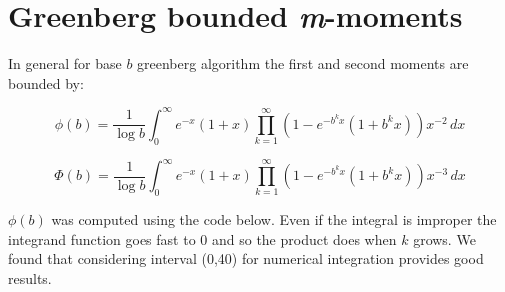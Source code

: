 \begin{appendices}
\begin{table}[H]
\caption[\emph{Clipped Modified Binary Tree}: Performance report.]{\emph{Clipped Modified Binary Tree}: performance report. Experimental results obtained by running CMBT algorithm on  random generated instances.}
\begin{center}
\end{center}
\end{table}


\section{Greenberg bounded \emph{m}-moments}
\label{sec:greenberg-moments}
In general for base $b$ greenberg algorithm the first and second moments are bounded by:

\begin{equation}
\phi(b)= \frac{1}{\log b} \int_{0}^{\infty} \! e^{-x}(1+x) \prod_{k=1}^{\infty}(1-e^{-b^{k}x}(1+b^{k}x))x^{-2} \, dx
\label{eq:greenberg-b-phi}
\end{equation}

\begin{equation}
\Phi(b)= \frac{1}{\log b} \int_{0}^{\infty} \! e^{-x}(1+x) \prod_{k=1}^{\infty}(1-e^{-b^{k}x}(1+b^{k}x))x^{-3} \, dx
\label{eq:greenberg-b-Phi}
\end{equation}

\noindent $\phi(b)$ was computed using the code below. Even if the integral is improper the integrand function goes fast to 0 and so the product does when $k$ grows. We found that considering interval (0,40) for numerical integration provides good results.\\
\begin{comment}




\end{comment}


\end{appendices}

